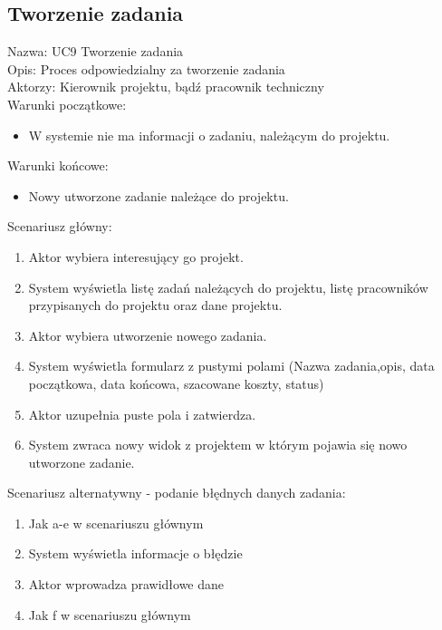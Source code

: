 \subsection{Tworzenie zadania}
Nazwa: UC9 Tworzenie zadania\\
Opis: Proces odpowiedzialny za tworzenie zadania\\
Aktorzy: Kierownik projektu, bądź pracownik techniczny \\
Warunki początkowe:
\begin{itemize}
\item W systemie nie ma informacji o zadaniu, należącym do projektu.
\end{itemize}
Warunki końcowe:
\begin{itemize}
\item Nowy utworzone zadanie należące do projektu.
\end{itemize}
Scenariusz główny:
\begin{enumerate}
\item Aktor wybiera interesujący go projekt.
\item System wyświetla listę zadań należących do projektu, listę pracowników przypisanych do projektu oraz dane projektu.
\item Aktor wybiera utworzenie nowego zadania.
\item System wyświetla formularz z pustymi polami (Nazwa zadania,opis, data początkowa, data końcowa, szacowane koszty, status)
\item Aktor uzupełnia puste pola i zatwierdza.
\item System zwraca nowy widok z projektem w którym pojawia się nowo utworzone zadanie.
\end{enumerate}
Scenariusz alternatywny - podanie błędnych danych zadania: 
\begin{enumerate}
\item Jak a-e w scenariuszu głównym
\item System wyświetla informacje o błędzie
\item Aktor wprowadza prawidłowe dane
\item Jak f w scenariuszu głównym
\end{enumerate}

